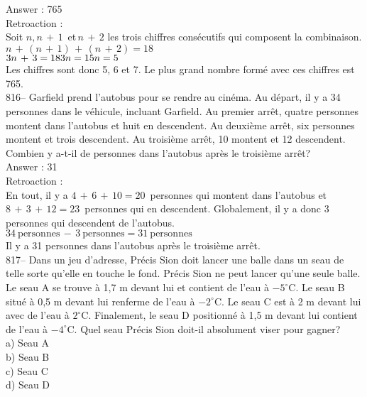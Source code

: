 ﻿\documentclass[letterpaper, 12pt]{article}
\begin{document}
Answer : 765\\

Retroaction : \\
Soit $n, n\,+\,1\,$ et$\, n\,+\,2$ les trois chiffres cons\'ecutifs qui
composent la combinaison.  \\
$n\,+\,\left( n\,+\,1\right) \,+\,\left( n\,+\,2\right) = 18$\\
$3n\,+\,3=18\\
3n=15\\
n=5$\\
Les chiffres sont donc 5, 6 et 7.  Le plus grand nombre form\'e avec ces
chiffres est 765.\\


816-- Garfield prend l'autobus pour se rendre au cin\'ema.  Au d\'epart, il
y a 34 personnes dans le v\'ehicule, incluant Garfield.  Au premier arr\^et,
quatre personnes montent dans l'autobus et huit en descendent.  Au
deuxi\`eme arr\^et, six personnes montent et trois descendent.  Au
troisi\`eme arr\^et, 10 montent et 12 descendent.  Combien y a-t-il de
personnes dans l'autobus apr\`es le troisi\`eme arr\^et?\\

Answer : 31\\

Retroaction : \\
En tout, il y a $4\,+\,6\,+\,10=20$~personnes qui montent dans l'autobus et
$8\,+\,3\,+\,12=23$~personnes qui en descendent.  Globalement, il y a donc 3
personnes qui descendent de l'autobus.  \\
$34~\textrm{personnes}\,-\,3~\textrm{personnes}=31~\textrm{personnes}$ \\
Il y a 31 personnes dans l'autobus apr\`es le troisi\`eme arr\^et.\\

817-- Dans un jeu d'adresse, Pr\'ecis Sion doit lancer une balle dans un
seau de telle sorte qu'elle en touche le fond.  Pr\'ecis Sion ne peut lancer
qu'une seule balle.  Le seau A se trouve \`a 1,7 m devant lui et contient de
l'eau \`a $-5^{\circ}$C.  Le seau B situ\'e \`a 0,5 m devant lui renferme de
l'eau \`a $-2^{\circ}$C.  Le seau C est \`a 2 m devant lui avec de l'eau \`a
$2^{\circ}$C.  Finalement, le seau D positionn\'e \`a 1,5 m devant lui
contient de l'eau \`a $-4^{\circ}$C.  Quel seau Pr\'ecis Sion doit-il
absolument viser pour gagner?\\
a) Seau A\\
b) Seau B\\
c) Seau C\\
d) Seau D\\
\end{document}
